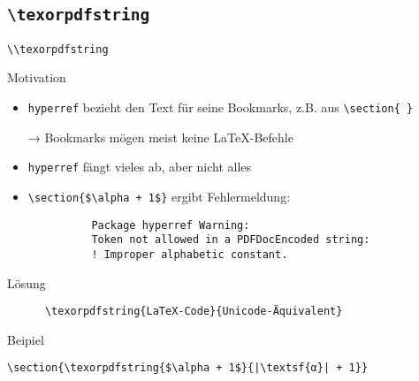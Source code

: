 \subsection{\texttt{\textbackslash texorpdfstring}}

\begin{frame}[fragile]{\lstinline+\\texorpdfstring+}
  \begin{block}{Motivation}
    \begin{itemize}
      \item \texttt{hyperref} bezieht den Text für seine Bookmarks, z.B. aus \lstinline+\section{ }+
      \item[→] Bookmarks mögen meist keine \LaTeX-Befehle
      \item \texttt{hyperref} fängt vieles ab, aber nicht alles
      \item
        \lstinline!\section{$\alpha + 1$}! ergibt Fehlermeldung:
        \begin{lstlisting}
          Package hyperref Warning:
          Token not allowed in a PDFDocEncoded string:
          ! Improper alphabetic constant.
        \end{lstlisting}
    \end{itemize}
  \end{block}
  \begin{block}{Lösung}
    \begin{lstlisting}
      \texorpdfstring{LaTeX-Code}{Unicode-Äquivalent}
    \end{lstlisting}
  \end{block}
  \begin{block}{Beipiel}
    \begin{lstlisting}[escapechar=|]
      \section{\texorpdfstring{$\alpha + 1$}{|\textsf{α}| + 1}}
    \end{lstlisting}
  \end{block}
\end{frame}
